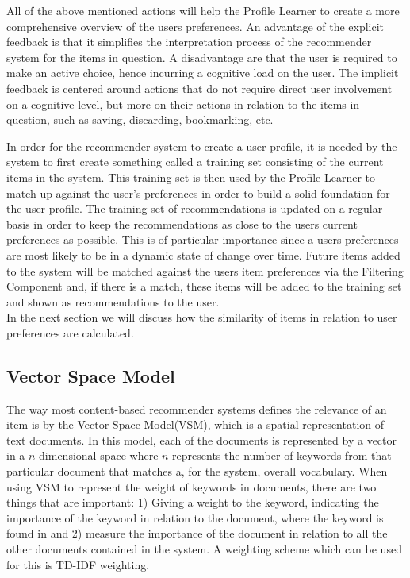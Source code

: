 All of the above mentioned actions will help the Profile Learner to create a more comprehensive overview of the users preferences. An advantage of the explicit feedback is that it simplifies the interpretation process of the recommender system for the items in question. A disadvantage are that the user is required to make an active choice, hence incurring a cognitive load on the user. The implicit feedback is centered around actions that do not require direct user involvement on a cognitive level, but more on their actions in relation to the items in question, such as saving, discarding, bookmarking, etc.\newline

In order for the recommender system to create a user profile, it is needed by the system to first create something called a training set consisting of the current items in the system. This training set is then used by the Profile Learner to match up against the user's preferences in order to build a solid foundation for the user profile. The training set of recommendations is updated on a regular basis in order to keep the recommendations as close to the users current preferences as possible. This is of particular importance since a users preferences are most likely to be in a dynamic state of change over time. Future items added to the system will be matched against the users item preferences via the Filtering Component and, if there is a match, these items will be added to the training set and shown as recommendations to the user. \\
In the next section we will discuss how the similarity of items in relation to user preferences are calculated.

\subsection{Vector Space Model}
The way most content-based recommender systems defines the relevance of an item is by the Vector Space Model(VSM), which is a spatial representation of text documents. In this model, each of the documents is represented by a vector in a \(n\)-dimensional space where \(n\) represents the number of keywords from that particular document that matches a, for the system, overall vocabulary.\newline
When using VSM to represent the weight of keywords in documents, there are two things that are important: 1) Giving a weight to the keyword, indicating the importance of the keyword in relation to the document, where the keyword is found in and 2) measure the importance of the document in relation to all the other documents contained in the system. A weighting scheme which can be used for this is TD-IDF weighting. \newline

